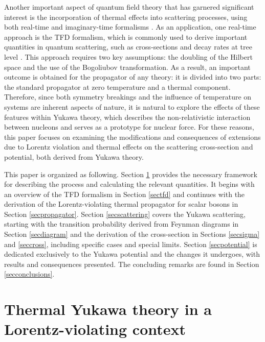 \documentclass[11pt,showpacs,preprintnumbers,amsmath,amssymb,prd,nofootinbib,superscriptaddress]{revtex4-2}
\begin{document}
Another important aspect of quantum field theory that has garnered significant interest is the incorporation of thermal effects into scattering processes, using both real-time and imaginary-time formalisms \cite{temp00, temp000, khannatfd, temp1, temp2, temp3, temp4}. As an application, one real-time approach is the TFD formalism, which is commonly used to derive important quantities in quantum scattering, such as cross-sections and decay rates at tree level \textcolor{red}{\cite{scatter1, scatter2, scatter3, santos2022temperature, santos2016quantized}}. This approach requires two key assumptions: the doubling of the Hilbert space and the use of the Bogoliubov transformation. As a result, an important outcome is obtained for the propagator of any theory: it is divided into two parts: the standard propagator at zero temperature and a thermal component. Therefore, since both symmetry breakings and the influence of temperature on systems are inherent aspects of nature, it is natural to explore the effects of these features within Yukawa theory, which describes the non-relativistic interaction between nucleons and serves as a prototype for nuclear force. For these reasons, this paper focuses on examining the modifications and consequences of extensions due to Lorentz violation and thermal effects on the scattering cross-section and potential, both derived from Yukawa theory. 

This paper is organized as following. Section \ref{sec1} provides the necessary framework for describing the process and calculating the relevant quantities. It begins with an overview of the TFD formalism in Section \ref{sectfd} and continues with the derivation of the Lorentz-violating thermal propagator for scalar bosons in Section \ref{secpropagator}. Section \ref{secscattering} covers the Yukawa scattering, starting with the transition probability derived from Feynman diagrams in Section \ref{secdiagram} and the derivation of the cross-section in Sections \ref{secsigma} and \ref{seccross}, including specific cases and special limits. Section \ref{secpotential} is dedicated exclusively to the Yukawa potential and the changes it undergoes, with results and consequences presented. The concluding remarks are found in Section \ref{secconclusions}.


\section{Thermal Yukawa theory in a Lorentz-violating context}\label{sec1}
\end{document}
